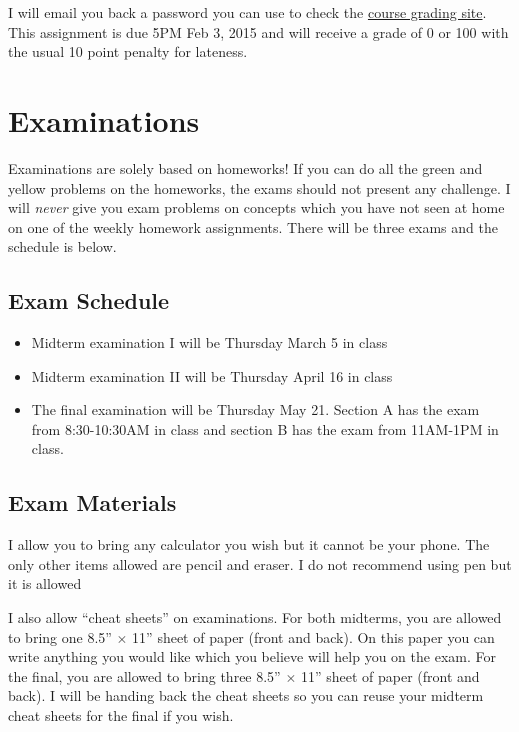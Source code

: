 \documentclass[12pt]{article}
\newcommand{\qu}[1]{``#1''}
\begin{document}
I will email you back a password you can use to check the \href{http://kapelner.com/grades}{course grading site}. \\

This assignment is due 5PM Feb 3, 2015 and will receive a grade of 0 or 100 with the usual 10 point penalty for lateness.


\section*{Examinations}

Examinations are solely based on homeworks! If you can do all the green and yellow problems on the homeworks, the exams should not present any challenge. I will \textit{never} give you exam problems on concepts which you have not seen at home on one of the weekly homework assignments. There will be three exams and the schedule is below.

\subsection*{Exam Schedule}\label{subsec:exam_schedule}

\begin{itemize}
\itemsep -0.0em 
\item Midterm examination I will be Thursday March 5 in class
\item Midterm examination II will be Thursday April 16 in class
\item The final examination will be Thursday May 21. Section A has the exam from 8:30-10:30AM in class and section B has the exam from 11AM-1PM in class.
\end{itemize}

\subsection*{Exam Materials}

I allow you to bring any calculator you wish but it cannot be your phone. The only other items allowed are pencil and eraser. I do not recommend using pen but it is allowed

I also allow \qu{cheat sheets} on examinations. For both midterms, you are allowed to bring one 8.5'' $\times$ 11'' sheet of paper (front and back). On this paper you can write anything you would like which you believe will help you on the exam. For the final, you are allowed to bring three 8.5'' $\times$ 11'' sheet of paper (front and back). I will be handing back the cheat sheets so you can reuse your midterm cheat sheets for the final if you wish. 
\end{document}
